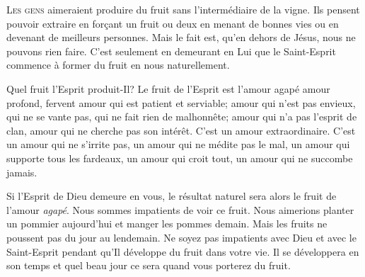 
\lettrine{L}{es gens} aimeraient produire du fruit
 sans l'intermédiaire de la vigne. Ils pensent pouvoir extraire
 en for\c{c}ant un fruit ou deux en menant de bonnes vies ou en devenant
 de meilleurs personnes. Mais le fait est, qu'en dehors de Jésus,
 nous ne pouvons rien faire. C'est seulement en demeurant en Lui
 que le Saint-Esprit commence à former du fruit en nous \ocadr naturellement.

Quel fruit l'Esprit produit-Il? Le fruit de l'Esprit est l'amour
 \Og agapé \Fg{} \ocadr amour profond, fervent \fcadr{} amour qui est patient
 et serviable; amour qui n'est pas envieux, qui ne se vante pas,
 qui ne fait rien de malhonnête; amour qui n'a pas l'esprit de clan,
 amour qui ne cherche pas son intérêt. C'est un amour extraordinaire.
 C'est un amour qui ne s'irrite pas, un amour qui ne médite pas le mal,
 un amour qui supporte tous les fardeaux, un amour qui croit tout,
 un amour qui ne succombe jamais.


Si l'Esprit de Dieu demeure en vous, le résultat naturel sera alors
 le fruit de l'amour \emph{agapé}.
 Nous sommes impatients de voir ce fruit.
 Nous aimerions planter un pommier aujourd'hui et manger les pommes demain.
 Mais les fruits ne poussent pas du jour au lendemain.
 Ne soyez pas impatients avec Dieu et avec le Saint-Esprit pendant
 qu'Il développe du fruit dans votre vie.
 Il se développera en son temps
 \ocadr et quel beau jour ce sera quand vous porterez du fruit.

\dvrule






